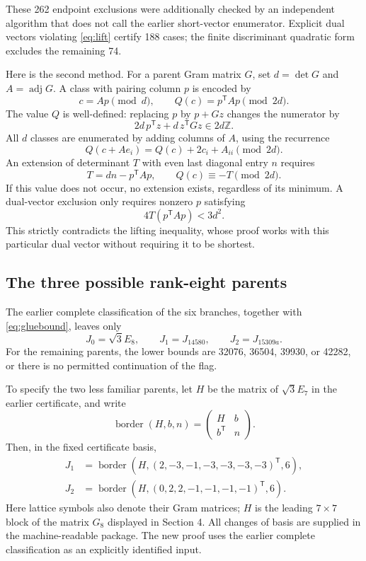 \documentclass[11pt,a4paper]{article}
\theoremstyle{remark}\newtheorem{remark}[theorem]{Remark}
\newcommand{\Z}{\mathbb Z}\newcommand{\R}{\mathbb R}\newcommand{\F}{\mathbb F}
\begin{document}
These 262 endpoint exclusions were additionally checked by an independent algorithm that does not call the earlier short-vector enumerator. Explicit dual vectors violating \eqref{eq:lift} certify 188 cases; the finite discriminant quadratic form excludes the remaining 74.

Here is the second method. For a parent Gram matrix $G$, set $d=\det G$ and $A=\operatorname{adj}G$. A class with pairing column $p$ is encoded by
\[
c=Ap\pmod d,\qquad Q(c)=p^{\mathsf T}Ap\pmod{2d}.
\]
The value $Q$ is well-defined: replacing $p$ by $p+Gz$ changes the numerator by
\[
2d\,p^{\mathsf T}z+d\,z^{\mathsf T}Gz\in2d\Z.
\]
All $d$ classes are enumerated by adding columns of $A$, using the recurrence
\[
Q(c+Ae_i)=Q(c)+2c_i+A_{ii}\pmod{2d}.
\]
An extension of determinant $T$ with even last diagonal entry $n$ requires
\[
T=dn-p^{\mathsf T}Ap,\qquad Q(c)\equiv-T\pmod{2d}.
\]
If this value does not occur, no extension exists, regardless of its minimum. A dual-vector exclusion only requires nonzero $p$ satisfying
\[
4T(p^{\mathsf T}Ap)<3d^2.
\]
This strictly contradicts the lifting inequality, whose proof works with this particular dual vector without requiring it to be shortest.

\subsection{The three possible rank-eight parents}

The earlier complete classification of the six branches, together with \eqref{eq:gluebound}, leaves only
\[
J_0=\sqrt3E_8,\qquad J_1=J_{14580},\qquad J_2=J_{15309a}.
\]
For the remaining parents, the lower bounds are 32076, 36504, 39930, or 42282, or there is no permitted continuation of the flag.

To specify the two less familiar parents, let $H$ be the matrix of $\sqrt3E_7$ in the earlier certificate, and write
\[
\operatorname{border}(H,b,n)=\begin{pmatrix}H&b\\b^{\mathsf T}&n\end{pmatrix}.
\]
Then, in the fixed certificate basis,
\begin{align*}
J_1&=\operatorname{border}(H,(2,-3,-1,-3,-3,-3,-3)^{\mathsf T},6),\\
J_2&=\operatorname{border}(H,(0,2,2,-1,-1,-1,-1)^{\mathsf T},6).
\end{align*}
Here lattice symbols also denote their Gram matrices; $H$ is the leading $7\times7$ block of the matrix $G_8$ displayed in Section 4. All changes of basis are supplied in the machine-readable package. The new proof uses the earlier complete classification as an explicitly identified input.
\end{document}
